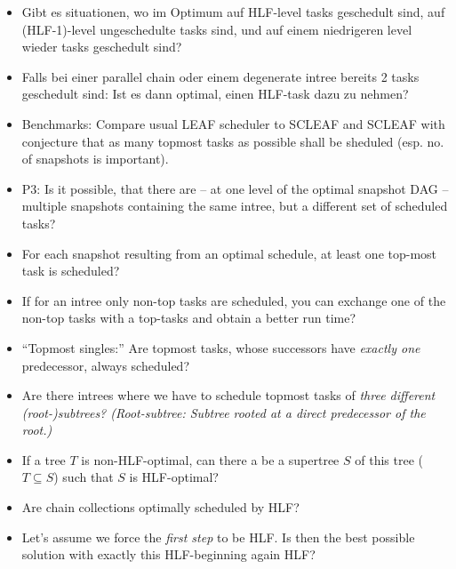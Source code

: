 \documentclass[a4paper, 10pt]{report}
\begin{document}
\begin{itemize}
\item Gibt es situationen, wo im Optimum auf HLF-level tasks geschedult sind, auf (HLF-1)-level ungeschedulte tasks sind, und auf einem niedrigeren level wieder tasks geschedult sind?
\item Falls bei einer parallel chain oder einem degenerate intree bereits 2 tasks geschedult sind: Ist es dann optimal, einen HLF-task dazu zu nehmen?
\item Benchmarks: Compare usual LEAF scheduler to SCLEAF and SCLEAF with conjecture that as many topmost tasks as possible shall be sheduled (esp. no. of snapshots is important).
\item P3: Is it possible, that there are -- at one level of the optimal snapshot DAG -- multiple snapshots containing the same intree, but a different set of scheduled tasks? 
\item For each snapshot resulting from an optimal schedule, at least one top-most task is scheduled? 
\item If for an intree only non-top tasks are scheduled, you can exchange one of the non-top tasks with a top-tasks and obtain a better run time?
\item ``Topmost singles:'' Are topmost tasks, whose successors have \emph{exactly one} predecessor, always scheduled?
\item Are there intrees where we have to schedule topmost tasks of \emph{three different (root-)subtrees? (Root-subtree: Subtree rooted at a direct predecessor of the root.)}
\item If a tree $T$ is non-HLF-optimal, can there a be a supertree $S$ of this tree ($T\subseteq S$) such that $S$ is HLF-optimal? 
\item Are chain collections optimally scheduled by HLF?
\item Let's assume we force the \emph{first step} to be HLF. Is then the best possible solution with exactly this HLF-beginning again HLF?
\end{itemize}
\end{document}
